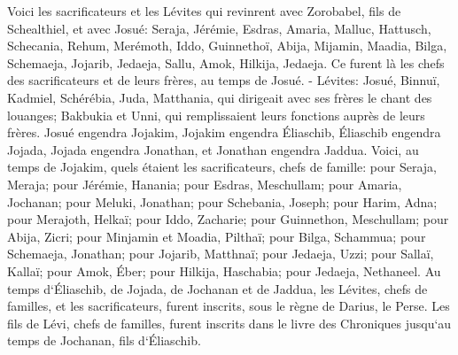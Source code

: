 \verse Voici les sacrificateurs et les Lévites qui revinrent avec Zorobabel, fils de Schealthiel, et avec Josué: Seraja, Jérémie, Esdras, 
\verse Amaria, Malluc, Hattusch, 
\verse Schecania, Rehum, Merémoth, 
\verse Iddo, Guinnethoï, Abija, 
\verse Mijamin, Maadia, Bilga, 
\verse Schemaeja, Jojarib, Jedaeja, 
\verse Sallu, Amok, Hilkija, Jedaeja. Ce furent là les chefs des sacrificateurs et de leurs frères, au temps de Josué. - 
\verse Lévites: Josué, Binnuï, Kadmiel, Schérébia, Juda, Matthania, qui dirigeait avec ses frères le chant des louanges; 
\verse Bakbukia et Unni, qui remplissaient leurs fonctions auprès de leurs frères. 
\verse Josué engendra Jojakim, Jojakim engendra Éliaschib, Éliaschib engendra Jojada, 
\verse Jojada engendra Jonathan, et Jonathan engendra Jaddua. 
\verse Voici, au temps de Jojakim, quels étaient les sacrificateurs, chefs de famille: pour Seraja, Meraja; pour Jérémie, Hanania; 
\verse pour Esdras, Meschullam; pour Amaria, Jochanan; 
\verse pour Meluki, Jonathan; pour Schebania, Joseph; 
\verse pour Harim, Adna; pour Merajoth, Helkaï; 
\verse pour Iddo, Zacharie; pour Guinnethon, Meschullam; 
\verse pour Abija, Zicri; pour Minjamin et Moadia, Pilthaï; 
\verse pour Bilga, Schammua; pour Schemaeja, Jonathan; 
\verse pour Jojarib, Matthnaï; pour Jedaeja, Uzzi; 
\verse pour Sallaï, Kallaï; pour Amok, Éber; 
\verse pour Hilkija, Haschabia; pour Jedaeja, Nethaneel. 
\verse Au temps d`Éliaschib, de Jojada, de Jochanan et de Jaddua, les Lévites, chefs de familles, et les sacrificateurs, furent inscrits, sous le règne de Darius, le Perse. 
\verse Les fils de Lévi, chefs de familles, furent inscrits dans le livre des Chroniques jusqu`au temps de Jochanan, fils d`Éliaschib. 
